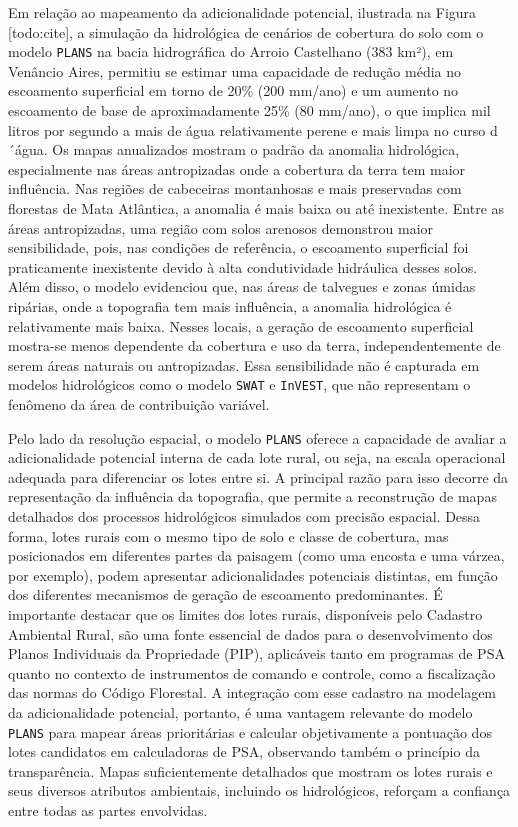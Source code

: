 \documentclass[./main.tex]{subfiles}
\begin{document}
\par Em relação ao mapeamento da adicionalidade potencial, ilustrada na Figura [todo:cite], a simulação da hidrológica de cenários de cobertura do solo com o modelo \texttt{PLANS} na bacia hidrográfica do Arroio Castelhano (383 km²), em Venâncio Aires, permitiu se estimar uma capacidade de redução média no escoamento superficial em torno de 20\% (200 mm/ano) e um aumento no escoamento de base de aproximadamente 25\% (80 mm/ano), o que implica mil litros por segundo a mais de água relativamente perene e mais limpa no curso d´água. Os mapas anualizados mostram o padrão da anomalia hidrológica, especialmente nas áreas antropizadas onde a cobertura da terra tem maior influência. Nas regiões de cabeceiras montanhosas e mais preservadas com florestas de Mata Atlântica, a anomalia é mais baixa ou até inexistente. Entre as áreas antropizadas, uma região com solos arenosos demonstrou maior sensibilidade, pois, nas condições de referência, o escoamento superficial foi praticamente inexistente devido à alta condutividade hidráulica desses solos. Além disso, o modelo evidenciou que, nas áreas de talvegues e zonas úmidas ripárias, onde a topografia tem mais influência, a anomalia hidrológica é relativamente mais baixa. Nesses locais, a geração de escoamento superficial mostra-se menos dependente da cobertura e uso da terra, independentemente de serem áreas naturais ou antropizadas. Essa sensibilidade não é capturada em modelos hidrológicos como o modelo \texttt{SWAT} e \texttt{InVEST}, que não representam o fenômeno da área de contribuição variável.

\par Pelo lado da resolução espacial, o modelo \texttt{PLANS} oferece a capacidade de avaliar a adicionalidade potencial interna de cada lote rural, ou seja, na escala operacional adequada para diferenciar os lotes entre si. A principal razão para isso decorre da representação da influência da topografia, que permite a reconstrução de mapas detalhados dos processos hidrológicos simulados com precisão espacial. Dessa forma, lotes rurais com o mesmo tipo de solo e classe de cobertura, mas posicionados em diferentes partes da paisagem (como uma encosta e uma várzea, por exemplo), podem apresentar adicionalidades potenciais distintas, em função dos diferentes mecanismos de geração de escoamento predominantes. É importante destacar que os limites dos lotes rurais, disponíveis pelo Cadastro Ambiental Rural, são uma fonte essencial de dados para o desenvolvimento dos Planos Individuais da Propriedade (PIP), aplicáveis tanto em programas de PSA quanto no contexto de instrumentos de comando e controle, como a fiscalização das normas do Código Florestal. A integração com esse cadastro na modelagem da adicionalidade potencial, portanto, é uma vantagem relevante do modelo \texttt{PLANS} para mapear áreas prioritárias e calcular objetivamente a pontuação dos lotes candidatos em calculadoras de PSA, observando também o princípio da transparência. Mapas suficientemente detalhados que mostram os lotes rurais e seus diversos atributos ambientais, incluindo os hidrológicos, reforçam a confiança entre todas as partes envolvidas. 
\end{document}
